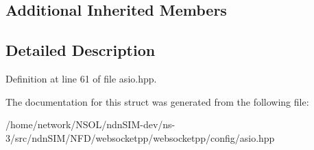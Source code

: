 \subsection*{Additional Inherited Members}


\subsection{Detailed Description}


Definition at line 61 of file asio.\+hpp.



The documentation for this struct was generated from the following file\+:\begin{DoxyCompactItemize}
\item 
/home/network/\+N\+S\+O\+L/ndn\+S\+I\+M-\/dev/ns-\/3/src/ndn\+S\+I\+M/\+N\+F\+D/websocketpp/websocketpp/config/asio.\+hpp\end{DoxyCompactItemize}
